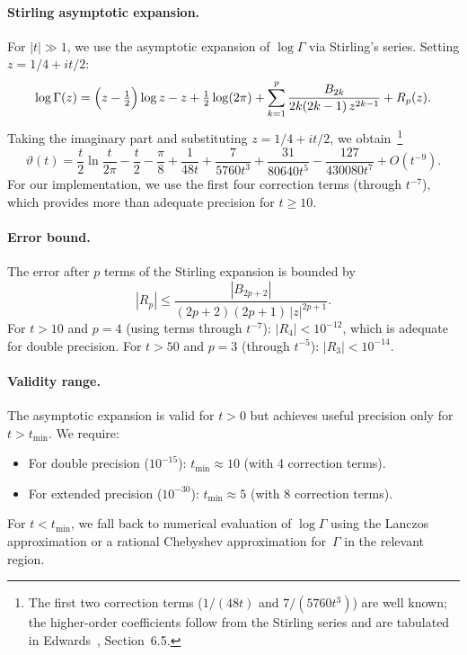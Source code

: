 \paragraph{Stirling asymptotic expansion.}
For $|t| \gg 1$, we use the asymptotic expansion of $\log\Gamma$ via Stirling's series.
Setting $z = 1/4 + it/2$:
\begin{equation}\label{eq:stirling}
  \log\Gamma(z) = \Bigl(z - \tfrac{1}{2}\Bigr)\log z - z + \tfrac{1}{2}\log(2\pi)
  + \sum_{k=1}^{p} \frac{B_{2k}}{2k(2k-1)\,z^{2k-1}} + R_p(z).
\end{equation}
Taking the imaginary part and substituting $z = 1/4 + it/2$, we
obtain~\cite{edwards1974}\footnote{The first two correction terms ($1/(48t)$ and
$7/(5760t^3)$) are well known; the higher-order coefficients follow from the Stirling
series and are tabulated in Edwards~\cite{edwards1974}, Section~6.5.}
\begin{equation}\label{eq:theta-asymp}
  \vartheta(t) = \frac{t}{2}\ln\frac{t}{2\pi} - \frac{t}{2} - \frac{\pi}{8}
  + \frac{1}{48t} + \frac{7}{5760t^3} + \frac{31}{80640t^5}
  - \frac{127}{430080t^7} + O(t^{-9}).
\end{equation}
For our implementation, we use the first four correction terms (through $t^{-7}$), which
provides more than adequate precision for $t \ge 10$.

\paragraph{Error bound.}
The error after $p$ terms of the Stirling expansion is bounded by
\begin{equation}\label{eq:stirling-error}
  |R_p| \le \frac{|B_{2p+2}|}{(2p+2)(2p+1)\,|z|^{2p+1}}.
\end{equation}
For $t > 10$ and $p = 4$ (using terms through $t^{-7}$): $|R_4| < 10^{-12}$, which is
adequate for double precision. For $t > 50$ and $p = 3$ (through $t^{-5}$):
$|R_3| < 10^{-14}$.

\paragraph{Validity range.}
The asymptotic expansion is valid for $t > 0$ but achieves useful precision only for
$t > t_{\min}$. We require:
\begin{itemize}
  \item For double precision ($10^{-15}$): $t_{\min} \approx 10$ (with 4 correction terms).
  \item For extended precision ($10^{-30}$): $t_{\min} \approx 5$ (with 8 correction terms).
\end{itemize}
For $t < t_{\min}$, we fall back to numerical evaluation of $\log\Gamma$ using the
Lanczos approximation or a rational Chebyshev approximation for~$\Gamma$ in the relevant
region.

